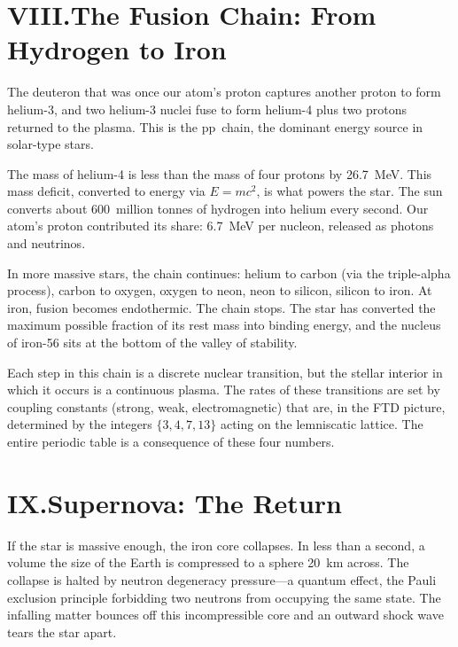 \documentclass[11pt,a4paper]{article}
\begin{document}
\section*{VIII.\quad The Fusion Chain: From Hydrogen to Iron}

The deuteron that was once our atom's proton captures another proton to form
helium-3, and two helium-3 nuclei fuse to form helium-4 plus two protons
returned to the plasma.  This is the pp~chain, the dominant energy source in
solar-type stars.

The mass of helium-4 is less than the mass of four protons by 26.7~MeV\@.
This mass deficit, converted to energy via $E=mc^2$, is what powers the
star.  The sun converts about 600~million tonnes of hydrogen into helium
every second.  Our atom's proton contributed its share: 6.7~MeV per nucleon,
released as photons and neutrinos.

In more massive stars, the chain continues: helium to carbon (via the
triple-alpha process), carbon to oxygen, oxygen to neon, neon to silicon,
silicon to iron.  At iron, fusion becomes endothermic.  The chain stops.
The star has converted the maximum possible fraction of its rest mass into
binding energy, and the nucleus of iron-56 sits at the bottom of the valley
of stability.

Each step in this chain is a discrete nuclear transition, but the stellar
interior in which it occurs is a continuous plasma.  The rates of these
transitions are set by coupling constants (strong, weak, electromagnetic)
that are, in the FTD picture, determined by the integers $\{3,4,7,13\}$
acting on the lemniscatic lattice.  The entire periodic table is a
consequence of these four numbers.

\section*{IX.\quad Supernova: The Return}

If the star is massive enough, the iron core collapses.  In less than a
second, a volume the size of the Earth is compressed to a sphere 20~km
across.  The collapse is halted by neutron degeneracy pressure---a quantum
effect, the Pauli exclusion principle forbidding two neutrons from occupying
the same state.  The infalling matter bounces off this incompressible core
and an outward shock wave tears the star apart.
\end{document}
